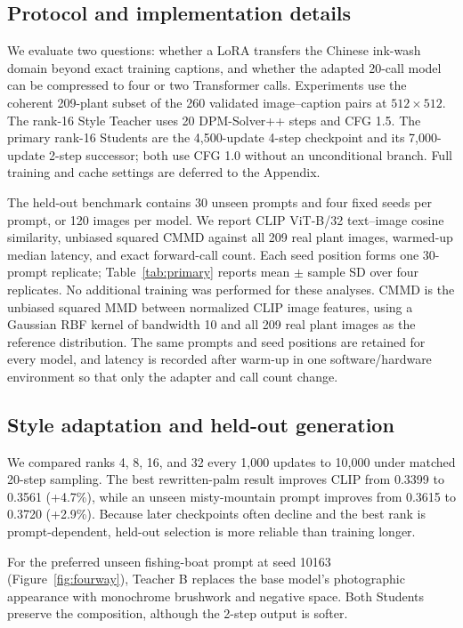 \documentclass{article}
\begin{document}
\subsection{Protocol and implementation details}
We evaluate two questions: whether a LoRA transfers the Chinese ink-wash domain
beyond exact training captions, and whether the adapted 20-call model can be
compressed to four or two Transformer calls.  Experiments use the coherent
209-plant subset of the 260 validated image--caption pairs at $512\times512$.
The rank-16 Style Teacher uses 20 DPM-Solver++ steps and CFG 1.5.  The primary
rank-16 Students are the 4,500-update 4-step checkpoint and its 7,000-update
2-step successor; both use CFG 1.0 without an unconditional branch.  Full
training and cache settings are deferred to the Appendix.

The held-out benchmark contains 30 unseen prompts and four fixed seeds per
prompt, or 120 images per model.  We report CLIP ViT-B/32 text--image cosine
similarity, unbiased squared CMMD against all 209 real plant images, warmed-up
median latency, and exact forward-call count.  Each seed position forms one
30-prompt replicate; Table~\ref{tab:primary} reports mean $\pm$ sample SD over
four replicates.  No additional training was performed for these analyses.
CMMD is the unbiased squared MMD between normalized CLIP image features, using
a Gaussian RBF kernel of bandwidth 10 and all 209 real plant images as the
reference distribution.  The same prompts and seed positions are retained for
every model, and latency is recorded after warm-up in one software/hardware
environment so that only the adapter and call count change.

\subsection{Style adaptation and held-out generation}
We compared ranks 4, 8, 16, and 32 every 1,000 updates to 10,000 under matched
20-step sampling.  The best rewritten-palm result improves CLIP from 0.3399 to
0.3561 (+4.7\%), while an unseen misty-mountain prompt improves from 0.3615 to
0.3720 (+2.9\%).  Because later checkpoints often decline and the best rank is
prompt-dependent, held-out selection is more reliable than training longer.

For the preferred unseen fishing-boat prompt at seed 10163
(Figure~\ref{fig:fourway}), Teacher B replaces the base model's photographic
appearance with monochrome brushwork and negative space.  Both Students preserve
the composition, although the 2-step output is softer.
\end{document}
